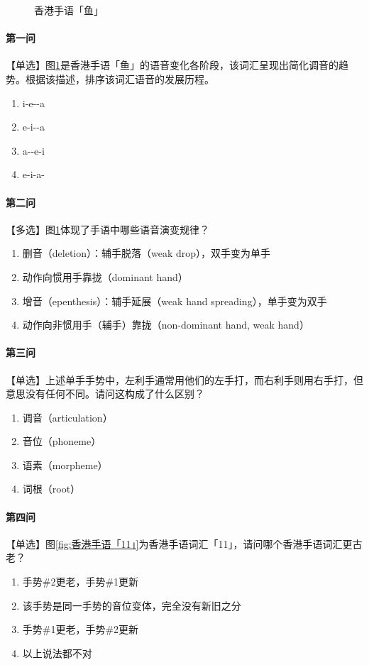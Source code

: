 \documentclass[12pt, a4paper, oneside]{ctexart}
\begin{document}
\begin{figure}[H]
{\begin{minipage}[t]{0.45\linewidth}
    \end{minipage}
    }%
    \centering
    \caption{香港手语「鱼」}
    \label{fig:香港手语「鱼」}
\end{figure}

\paragraph{第一问}
【单选】图\ref{fig:香港手语「鱼」}是香港手语「鱼」的语音变化各阶段，该词汇呈现出简化调音的趋势。根据该描述，排序该词汇语音的发展历程。
\begin{enumerate}[label=\Alph*.]
    \item i-e-\textrevepsilon-a
    \item e-i-\textrevepsilon-a
    \item a-\textrevepsilon-e-i
    \item e-i-a-\textrevepsilon
\end{enumerate}
\paragraph{第二问}
【多选】图\ref{fig:香港手语「鱼」}体现了手语中哪些语音演变规律？
\begin{enumerate}[label=\Alph*.]
    \item 删音（deletion）：辅手脱落（weak drop），双手变为单手
    \item 动作向惯用手靠拢（dominant hand）
    \item 增音（epenthesis）：辅手延展（weak hand spreading），单手变为双手
    \item 动作向非惯用手（辅手）靠拢（non-dominant hand, weak hand）
\end{enumerate}
\paragraph{第三问}
【单选】上述单手手势中，左利手通常用他们的左手打，而右利手则用右手打，但意思没有任何不同。请问这构成了什么区别？
\begin{enumerate}[label=\Alph*.]
    \item 调音（articulation）
    \item 音位（phoneme）
    \item 语素（morpheme）
    \item 词根（root）
\end{enumerate}
\newpage
\paragraph{第四问}
【单选】图\ref{fig:香港手语「11」}为香港手语词汇「11」，请问哪个香港手语词汇更古老？
\begin{enumerate}[label=\Alph*.]
    \item 手势\#2更老，手势\#1更新
    \item 该手势是同一手势的音位变体，完全没有新旧之分
    \item 手势\#1更老，手势\#2更新
    \item 以上说法都不对
\end{enumerate}
\end{document}
